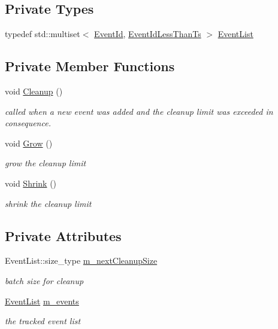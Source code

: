 \subsection*{Private Types}
\begin{DoxyCompactItemize}
\item 
typedef std\+::multiset$<$ \hyperlink{classns3_1_1EventId}{Event\+Id}, \hyperlink{structns3_1_1EventGarbageCollector_1_1EventIdLessThanTs}{Event\+Id\+Less\+Than\+Ts} $>$ \hyperlink{classns3_1_1EventGarbageCollector_a8f6e21ebc2783ecc5f82fa657a912632}{Event\+List}
\end{DoxyCompactItemize}
\subsection*{Private Member Functions}
\begin{DoxyCompactItemize}
\item 
void \hyperlink{classns3_1_1EventGarbageCollector_a960061b6d79529f856015d723ebef46e}{Cleanup} ()
\begin{DoxyCompactList}\small\item\em called when a new event was added and the cleanup limit was exceeded in consequence. \end{DoxyCompactList}\item 
void \hyperlink{classns3_1_1EventGarbageCollector_ac640851cdfce5f4d8eb3a2c81da04f4f}{Grow} ()
\begin{DoxyCompactList}\small\item\em grow the cleanup limit \end{DoxyCompactList}\item 
void \hyperlink{classns3_1_1EventGarbageCollector_ae99cf72d153cc5dfbab1ba9326baab05}{Shrink} ()
\begin{DoxyCompactList}\small\item\em shrink the cleanup limit \end{DoxyCompactList}\end{DoxyCompactItemize}
\subsection*{Private Attributes}
\begin{DoxyCompactItemize}
\item 
Event\+List\+::size\+\_\+type \hyperlink{classns3_1_1EventGarbageCollector_aaa004410658c6a7150930651c7365185}{m\+\_\+next\+Cleanup\+Size}
\begin{DoxyCompactList}\small\item\em batch size for cleanup \end{DoxyCompactList}\item 
\hyperlink{classns3_1_1EventGarbageCollector_a8f6e21ebc2783ecc5f82fa657a912632}{Event\+List} \hyperlink{classns3_1_1EventGarbageCollector_a890e5516cc3222b941336e061f261baf}{m\+\_\+events}
\begin{DoxyCompactList}\small\item\em the tracked event list \end{DoxyCompactList}\end{DoxyCompactItemize}


